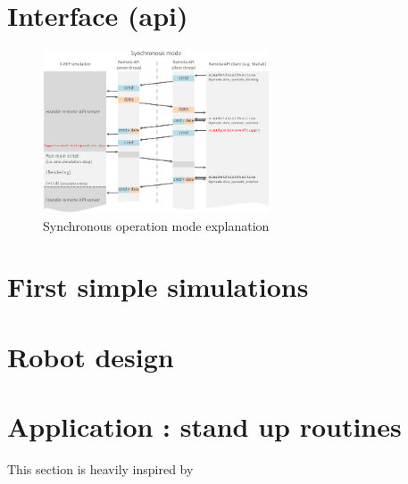 \section{Interface (api)}

\begin{figure}[htp]
\center
\includegraphics[width=0.6\textwidth]{figures/remoteApiSynchronous}
\caption{Synchronous operation mode explanation}
\label{fig:remoteApi}
\end{figure}

\section{First simple simulations}

\section{Robot design}

\section{Application : stand up routines}
This section is heavily inspired by \cite{Stuckler06}